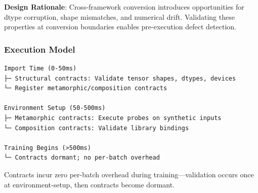 \textbf{Design Rationale}: Cross-framework conversion introduces opportunities for dtype corruption, shape mismatches, and numerical drift. Validating these properties at conversion boundaries enables pre-execution defect detection.

\subsubsection{Execution Model}

\begin{verbatim}
Import Time (0-50ms)
├─ Structural contracts: Validate tensor shapes, dtypes, devices
└─ Register metamorphic/composition contracts

Environment Setup (50-500ms)
├─ Metamorphic contracts: Execute probes on synthetic inputs
└─ Composition contracts: Validate library bindings

Training Begins (>500ms)
└─ Contracts dormant; no per-batch overhead
\end{verbatim}

Contracts incur zero per-batch overhead during training---validation occurs once at environment-setup, then contracts become dormant.
